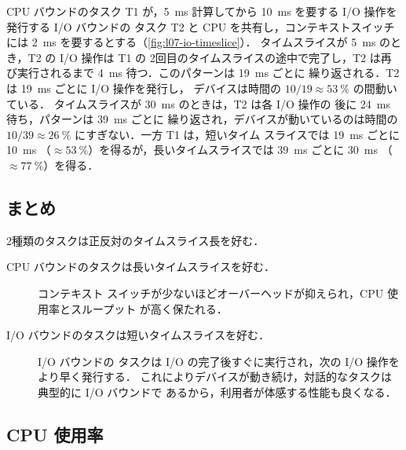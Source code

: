 \documentclass[../main.tex]{subfiles}
\begin{document}
\begin{example}
  \label{ex:l07-io-bound}
  CPU バウンドのタスク T1 が，\SI{5}{\milli\second} 計算してから
  \SI{10}{\milli\second} を要する I/O 操作を発行する I/O バウンドの
  タスク T2 と CPU を共有し，コンテキストスイッチには
  \SI{2}{\milli\second} を要するとする（\cref{fig:l07-io-timeslice}）．
  タイムスライスが \SI{5}{\milli\second} のとき，T2 の I/O 操作は T1 の
  2回目のタイムスライスの途中で完了し，T2 は再び実行されるまで
  \SI{4}{\milli\second} 待つ．このパターンは \SI{19}{\milli\second} ごとに
  繰り返される．T2 は \SI{19}{\milli\second} ごとに I/O 操作を発行し，
  デバイスは時間の $10/19 \approx \SI{53}{\percent}$ の間動いている．
  タイムスライスが \SI{30}{\milli\second} のときは，T2 は各 I/O 操作の
  後に \SI{24}{\milli\second} 待ち，パターンは \SI{39}{\milli\second} ごとに
  繰り返され，デバイスが動いているのは時間の
  $10/39 \approx \SI{26}{\percent}$ にすぎない．一方 T1 は，短いタイム
  スライスでは \SI{19}{\milli\second} ごとに \SI{10}{\milli\second}
  （$\approx\SI{53}{\percent}$）を得るが，長いタイムスライスでは
  \SI{39}{\milli\second} ごとに \SI{30}{\milli\second}
  （$\approx\SI{77}{\percent}$）を得る．
\end{example}

\subsection{まとめ}

2種類のタスクは正反対のタイムスライス長を好む．
\begin{description}
  \item[CPU バウンドのタスクは長いタイムスライスを好む．] コンテキスト
    スイッチが少ないほどオーバーヘッドが抑えられ，CPU 使用率とスループット
    が高く保たれる．
  \item[I/O バウンドのタスクは短いタイムスライスを好む．] I/O バウンドの
    タスクは I/O の完了後すぐに実行され，次の I/O 操作をより早く発行する．
    これによりデバイスが動き続け，対話的なタスクは典型的に I/O バウンドで
    あるから，利用者が体感する性能も良くなる．
\end{description}

\subsection{CPU 使用率}
\end{document}
